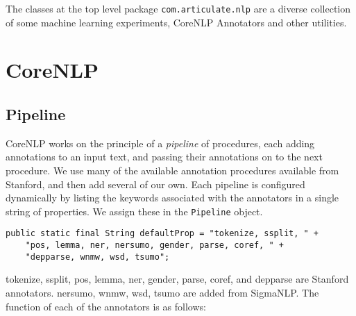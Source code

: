 \documentclass{book}
\begin{document}
The classes at the top level package \texttt{com.articulate.nlp} are a diverse
collection of some machine learning experiments, CoreNLP Annotators and other
utilities.

\chapter{CoreNLP}

\section{Pipeline}

CoreNLP works on the principle of a \textit{pipeline} of procedures, each adding
annotations to an input text, and passing their annotations on to the next
procedure.  We use many of the available annotation procedures available from
Stanford, and then add several of our own.  Each pipeline is configured
dynamically by listing the keywords associated with the annotators in a single
string of properties.  We assign these in the
\texttt{Pipeline} object.

\begin{lstlisting}[basicstyle=\ttfamily\small\bfseries]
public static final String defaultProp = "tokenize, ssplit, " +
    "pos, lemma, ner, nersumo, gender, parse, coref, " +
    "depparse, wnmw, wsd, tsumo";
\end{lstlisting}

tokenize, ssplit, pos, lemma, ner, gender, parse, coref, and depparse are
Stanford annotators. nersumo, wnmw, wsd, tsumo are added from SigmaNLP.
The function of each of the annotators is as follows:
\end{document}
